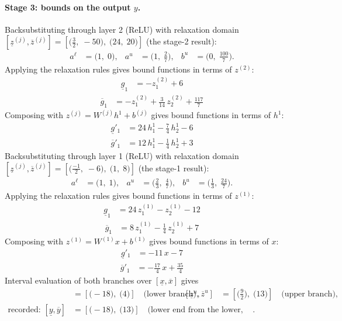 \documentclass[11pt]{article}
\begin{document}
\paragraph{Stage 3: bounds on the output $y$.}
Backsubstituting through layer 2 (ReLU) with relaxation domain $[\underline{z}^{(j)}, \overline{z}^{(j)}] = [\bigl(\frac{3}{2},\; -50\bigr),\; \bigl(24,\; 20\bigr)]$ (the stage-2 result):
\begin{align*}
a^{\ell} &= \bigl(1,\; 0\bigr), & a^{u} &= \bigl(1,\; \frac{2}{7}\bigr), & b^{u} &= \bigl(0,\; \frac{100}{7}\bigr).
\end{align*}
Applying the relaxation rules gives bound functions in terms of $z^{(2)}$:
\begin{align*}
\underline{g}_{1} &= -z^{(2)}_{1} + 6
\end{align*}
\begin{align*}
\overline{g}_{1} &= -z^{(2)}_{1} + \frac{3}{14}\,z^{(2)}_{2} + \frac{117}{7}
\end{align*}
Composing with $z^{(j)} = W^{(j)} h^{1} + b^{(j)}$ gives bound functions in terms of $h^{1}$:
\begin{align*}
\underline{g}'_{1} &= 24\,h^{1}_{1} - \frac{7}{4}\,h^{1}_{2} - 6
\end{align*}
\begin{align*}
\overline{g}'_{1} &= 12\,h^{1}_{1} - \frac{1}{4}\,h^{1}_{2} + 3
\end{align*}
Backsubstituting through layer 1 (ReLU) with relaxation domain $[\underline{z}^{(j)}, \overline{z}^{(j)}] = [\bigl(\frac{-1}{2},\; -6\bigr),\; \bigl(1,\; 8\bigr)]$ (the stage-1 result):
\begin{align*}
a^{\ell} &= \bigl(1,\; 1\bigr), & a^{u} &= \bigl(\frac{2}{3},\; \frac{4}{7}\bigr), & b^{u} &= \bigl(\frac{1}{3},\; \frac{24}{7}\bigr).
\end{align*}
Applying the relaxation rules gives bound functions in terms of $z^{(1)}$:
\begin{align*}
\underline{g}_{1} &= 24\,z^{(1)}_{1} - z^{(1)}_{2} - 12
\end{align*}
\begin{align*}
\overline{g}_{1} &= 8\,z^{(1)}_{1} - \frac{1}{4}\,z^{(1)}_{2} + 7
\end{align*}
Composing with $z^{(1)} = W^{(1)} x + b^{(1)}$ gives bound functions in terms of $x$:
\begin{align*}
\underline{g}'_{1} &= -11\,x - 7
\end{align*}
\begin{align*}
\overline{g}'_{1} &= -\frac{17}{4}\,x + \frac{35}{4}
\end{align*}
Interval evaluation of both branches over $[\underline{x}, \overline{x}]$ gives
\begin{align*}
[\underline{z}^{\ell}, \overline{z}^{\ell}] &= [\bigl(-18\bigr),\; \bigl(4\bigr)] \quad\text{(lower branch)}, & [\underline{z}^{u}, \overline{z}^{u}] &= [\bigl(\frac{9}{2}\bigr),\; \bigl(13\bigr)] \quad\text{(upper branch)}, \\
\text{recorded: } [\underline{y}, \overline{y}] &= [\bigl(-18\bigr),\; \bigl(13\bigr)] \quad\text{(lower end from the lower, upper end from the upper branch)}.
\end{align*}
\end{document}
